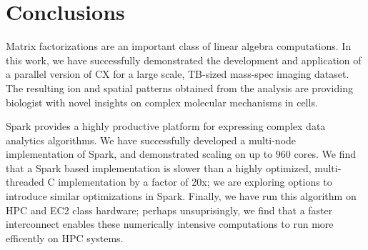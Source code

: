 \section{Conclusions}
\label{sec:conclusion}

Matrix factorizations are an important class of linear algebra computations. In this work, we have successfully demonstrated the development and application of a parallel version of CX for a large scale, TB-sized mass-spec imaging dataset. The resulting ion and spatial patterns obtained from the analysis are providing biologist with novel insights on complex molecular mechanisms in cells. 

Spark provides a highly productive platform for expressing complex data analytics algorithms. We have successfully developed a multi-node implementation of Spark, and demonstrated scaling on up to 960 cores. We find that a Spark based implementation is slower than a highly optimized, multi-threaded C implementation by a factor of 20x; we are exploring options to introduce similar optimizations in Spark. Finally, we have run this algorithm on HPC and EC2 class hardware; perhaps unsuprisingly, we find that a faster interconnect enables these numerically intensive computations to run more efficently on HPC systems. 

